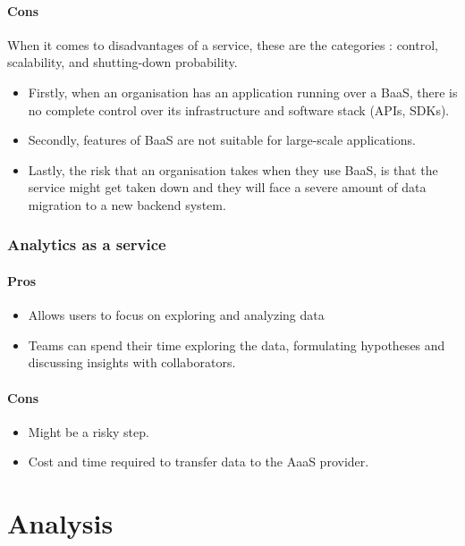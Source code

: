 \documentclass[a4paper,12pt]{report}
\begin{document}
      \subsubsection{Cons} 
      When it comes to disadvantages of a service, these are the categories :  control, scalability, and shutting-down probability. 
      \begin{itemize}
        \item Firstly, when an organisation has an application running over a BaaS, there is no complete control over its infrastructure and software stack (APIs, SDKs). 
        \item Secondly, features of BaaS are not suitable for large-scale applications. 
        \item Lastly, the risk that an organisation takes when they use BaaS, is that the service might get taken down and they will face a severe amount of data migration to a new backend system.
      \end{itemize}   
    
    \subsection{Analytics as a service}
    \subsubsection{Pros}
    \begin{itemize}
      \item Allows users to focus on exploring and analyzing data      
      \item Teams can spend their time exploring the data, formulating hypotheses and discussing insights with collaborators.      
    \end{itemize}
    
    \subsubsection{Cons}
    \begin{itemize}
      \item Might be a risky step.
      \item Cost and time required to transfer data to the AaaS provider.      
    \end{itemize}

    \chapter {Analysis}
\end{document}
